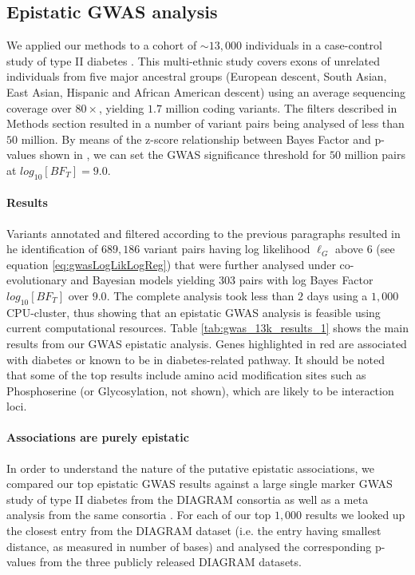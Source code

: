 \subsection{Epistatic GWAS analysis}

We applied our methods to a cohort of $\sim 13,000$ individuals in a case-control study of type II diabetes \cite{mccarthy2015T2D}.
This multi-ethnic study covers exons of unrelated individuals from five major ancestral groups (European descent, South Asian, East Asian, Hispanic and African American descent) using an average sequencing coverage over $80 \times$, yielding $1.7$ million coding variants. 
The filters described in Methods section resulted in a number of variant pairs being analysed of less than $50$ million. 
By means of the z-score relationship between Bayes Factor and p-values shown in \cite{goodman1999toward}, we can set the GWAS significance threshold for $50$ million pairs at $log_{10}[BF_T] =  9.0$.

\paragraph{Results}
Variants annotated and filtered according to the previous paragraphs resulted in he identification of  $689,186$ variant pairs having log likelihood $\ell_G$ above $6$ (see equation \ref{eq:gwasLogLikLogReg}) that were further analysed under co-evolutionary and Bayesian models yielding $303$ pairs with log Bayes Factor $log_10[BF_T]$ over $9.0$. 
The complete analysis took less than $2$ days using a $1,000$ CPU-cluster, thus showing that an epistatic GWAS analysis is feasible using current computational resources. 
Table \ref{tab:gwas_13k_results_1} shows the main results from our GWAS epistatic analysis.
Genes highlighted in red are associated with diabetes or known to be in diabetes-related pathway. 
It should be noted that some of the top results include amino acid modification sites such as Phosphoserine (or Glycosylation, not shown), which are likely to be interaction loci.

\paragraph{Associations are purely epistatic}
In order to understand the nature of the putative epistatic associations, we compared our top epistatic GWAS results against a large single marker GWAS study of type II diabetes from the DIAGRAM consortia \cite{zeggini2008meta,voight2010twelve} as well as a meta analysis from the same consortia \cite{morris2012large}.
For each of our top $1,000$ results we looked up the closest entry from the DIAGRAM dataset (i.e. the entry having smallest distance, as measured in number of bases) and analysed the corresponding p-values from the three publicly released DIAGRAM datasets.

